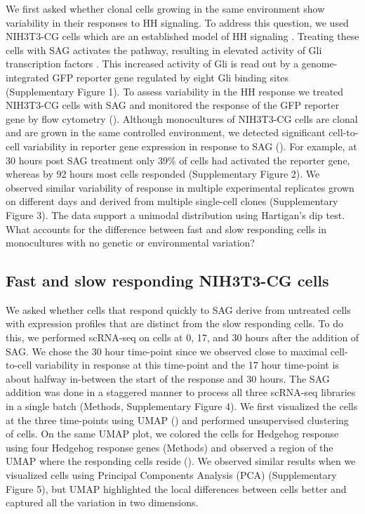 We first asked whether clonal cells growing in the same environment show variability in their responses to HH signaling. To address this question, we used NIH3T3-CG cells which are an established model of HH signaling \cite{Pusapati2018-gs,Kinnebrew2019-gt}. Treating these cells with SAG activates the pathway, resulting in elevated activity of Gli transcription factors \cite{Briscoe2013-ze,Lee2016-bf,Kong2019-wo}. This increased activity of Gli is read out by a genome-integrated GFP reporter gene regulated by eight Gli binding sites (Supplementary Figure 1). To assess variability in the HH response we treated NIH3T3-CG cells with SAG and monitored the response of the GFP reporter gene by flow cytometry (). Although monocultures of NIH3T3-CG cells are clonal and are grown in the same controlled environment, we detected significant cell-to-cell variability in reporter gene expression in response to SAG (). For example, at 30 hours post SAG treatment only 39\% of cells had activated the reporter gene, whereas by 92 hours most cells responded (Supplementary Figure 2). We observed similar variability of response in multiple experimental replicates grown on different days and derived from multiple single-cell clones (Supplementary Figure 3).  The data support a unimodal distribution using Hartigan’s dip test\cite{Hartigan1985-zq}. What accounts for the difference between fast and slow responding cells in monocultures with no genetic or environmental variation?

\subsection{Fast and slow responding NIH3T3-CG cells}


We asked whether cells that respond quickly to SAG derive from untreated cells with expression profiles that are distinct from the slow responding cells. To do this, we performed scRNA-seq on cells at 0, 17, and 30 hours after the addition of SAG. We chose the 30 hour time-point since we observed close to maximal cell-to-cell variability in response at this time-point and the 17 hour time-point is about halfway in-between the start of the response and 30 hours. The SAG addition was done in a staggered manner to process all three scRNA-seq libraries in a single batch (Methods, Supplementary Figure 4). We first visualized the cells at the three time-points using UMAP () and performed unsupervised clustering of cells. On the same UMAP plot, we colored the cells for Hedgehog response using four Hedgehog response genes (Methods) and observed a region of the UMAP where the responding cells reside (). We observed similar results when we visualized cells using Principal Components Analysis (PCA) (Supplementary Figure 5), but UMAP highlighted the local differences between cells better and captured all the variation in two dimensions.


